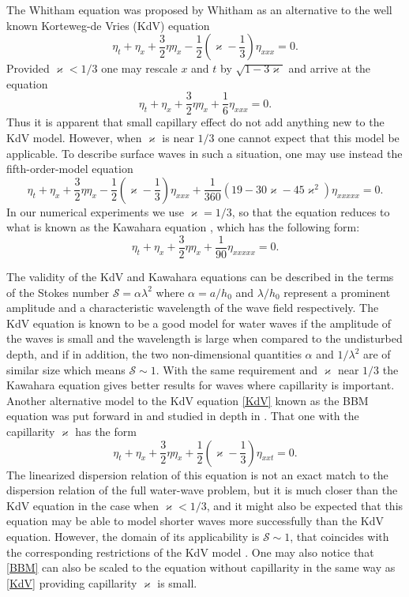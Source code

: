 The Whitham equation was proposed by Whitham \cite{Wh1} as an alternative to the
well known Korteweg-de Vries (KdV) equation
%
\begin{equation}
\label{KdV}
	\eta_t + \eta_x + \frac 32 \eta \eta_x
	- \frac 12 \left( \varkappa - \frac 13 \right) \eta_{xxx} = 0
	.
\end{equation}
%
Provided $\varkappa < 1/3$ one may rescale $x$ and $t$ by
$\sqrt{1 - 3 \varkappa}$ and arrive at the equation
%
\[
	\eta_t + \eta_x + \frac 32 \eta \eta_x
	+ \frac 16 \eta_{xxx} = 0
	.
\]
%
Thus it is apparent that small capillary effect do not add anything new
to the KdV model.
However, when $\varkappa$ is near $1/3$ one cannot expect
that this model be applicable.
To describe surface waves in such a situation, one may 
use instead the fifth-order-model equation
%
\begin{equation}
\label{Kawahara}
	\eta_t + \eta_x + \frac 32 \eta \eta_x
	- \frac 12 \left( \varkappa - \frac 13 \right) \eta_{xxx}
	+ \frac{1}{360} ( 19 - 30 \varkappa - 45 \varkappa^2 ) \eta_{xxxxx}
	= 0
	.
\end{equation}
%
In our numerical experiments we use $\varkappa = 1/3$, so that the equation
reduces to what is known as the Kawahara equation \citep{Biswas2009, Kawahara1972}, which 
has the following form:
%
\[
	\eta_t + \eta_x + \frac 32 \eta \eta_x
	+ \frac{1}{90} \eta_{xxxxx}
	= 0
	.
\]
%

The validity of the KdV and Kawahara equations can be described in the terms
of the Stokes number
\(
	\mathcal S = \alpha \lambda^2
\)
where $\alpha = a/h_0$ and $\lambda/h_0$ represent a prominent amplitude and
a characteristic wavelength of the wave field respectively.
The KdV equation is known to be a good model for water waves if the amplitude of 
the waves is small and the wavelength is large when compared to the undisturbed depth,
and if in addition, the two non-dimensional quantities $\alpha$ and 
$1 / \lambda^2$ are of similar size which means $\mathcal S \sim 1$.
With the same requirement and $\varkappa$ near $1/3$ the Kawahara
equation gives better results for waves where capillarity is important.
Another alternative model to the KdV equation \eqref{KdV} known as the BBM equation
was put forward in \cite{Peregrine1966} and studied in depth in \cite{Benjamin1972}.
That one with the capillarity $\varkappa$ has the form
%
\begin{equation}
\label{BBM}
	\eta_t + \eta_x + \frac 32 \eta \eta_x
	+ \frac 12 \left( \varkappa - \frac 13 \right) \eta_{xxt} = 0
	.
\end{equation}
%
The linearized dispersion relation 
of this equation is not an exact match to the dispersion relation of the full water-wave problem,
but it is much closer than the KdV equation in the case when $\varkappa < 1/3$, 
and it might also be expected that this equation may be able to model shorter waves more
successfully than the KdV equation.
However, the domain of its applicability is $\mathcal S \sim 1$,
that coincides with the corresponding
restrictions of the KdV model \cite{Benjamin1972}.
One may also notice that \eqref{BBM} can also be scaled
to the equation without capillarity in the same way as \eqref{KdV}
providing capillarity $\varkappa$ is small.





